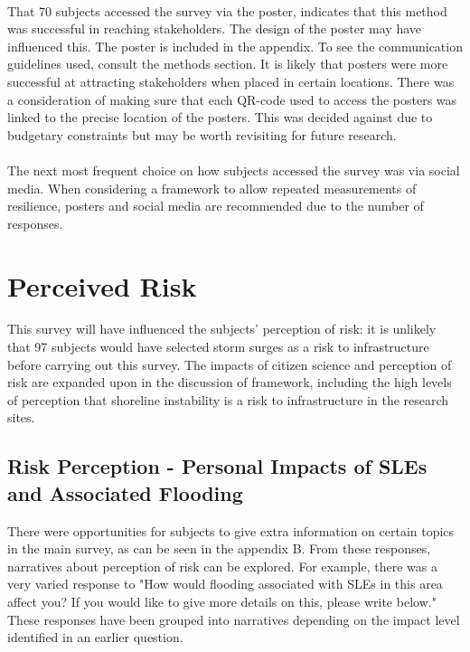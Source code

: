 \paragraph{}
That 70 subjects accessed the survey via the poster, indicates that this method was successful in reaching stakeholders. The design of the poster may have influenced this. The poster is included in the appendix. To see the communication guidelines used, consult the methods section. It is likely that posters were more successful at attracting stakeholders when placed in certain locations. There was a consideration of making sure that each QR-code used to access the posters was linked to the precise location of the posters. This was decided against due to budgetary constraints but may be worth revisiting for future research.

\paragraph{}
The next most frequent choice on how subjects accessed the survey was via social media. When considering a framework to allow repeated measurements of resilience, posters and social media are recommended due to the number of responses. 
\paragraph{}

\section{Perceived Risk}\label{discuss-percieved.risk}
This survey will have influenced the subjects' perception of risk: it is unlikely that 97 subjects would have selected storm surges as a risk to infrastructure before carrying out this survey. The impacts of citizen science and perception of risk are expanded upon in the discussion of framework, including the high levels of perception that shoreline instability is a risk to infrastructure in the research sites.

\subsection{Risk Perception - Personal Impacts of SLEs and Associated Flooding}
There were opportunities for subjects to give extra information on certain topics in the main survey, as can be seen in the appendix B. From these responses, narratives about perception of risk can be explored. For example, there was a very varied response to "How would flooding associated with SLEs in this area affect you? If you would like to give more details on this, please write below." These responses have been grouped into narratives depending on the impact level identified in an earlier question. 
